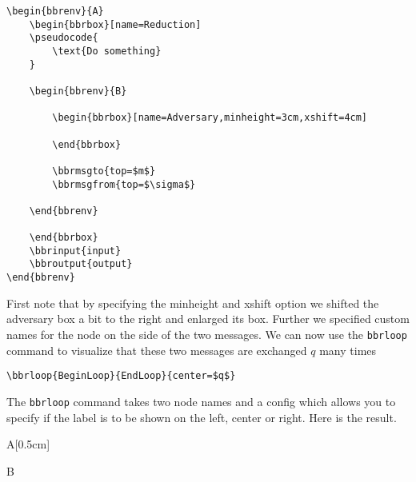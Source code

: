 \documentclass[a4paper]{report}
\begin{document}
\begin{lstlisting}
\begin{bbrenv}{A}
	\begin{bbrbox}[name=Reduction]
	\pseudocode{
		\text{Do something} 
	}

	\begin{bbrenv}{B}

		\begin{bbrbox}[name=Adversary,minheight=3cm,xshift=4cm]

		\end{bbrbox}
		
		\bbrmsgto{top=$m$}
		\bbrmsgfrom{top=$\sigma$}

	\end{bbrenv}

	\end{bbrbox}
	\bbrinput{input}
	\bbroutput{output}
\end{bbrenv}
\end{lstlisting}

First note that by specifying the minheight and xshift option we shifted the adversary box a bit to the right
and enlarged its box. Further we specified custom names for the node on the  side of the two messages. We
can now use the \lstinline$bbrloop$ command to visualize that these two messages are exchanged $q$ many times
\begin{lstlisting}
\bbrloop{BeginLoop}{EndLoop}{center=$q$}
\end{lstlisting}
The \lstinline$bbrloop$ command takes two node names and a config which allows you to specify if the label is
to be shown on the left, center or right. Here is the result.

\begin{bbrenv}[1cm]{A}[0.5cm]
	\begin{bbrbox}[name=Reduction]

	\begin{bbrenv}{B}

		\begin{bbrbox}[name=Adversary,minheight=3cm,xshift=4cm]

		\end{bbrbox}
		
		\bbrmsgspace{0.5cm}

	\end{bbrenv}

	\end{bbrbox}
\end{bbrenv}
\end{document}
